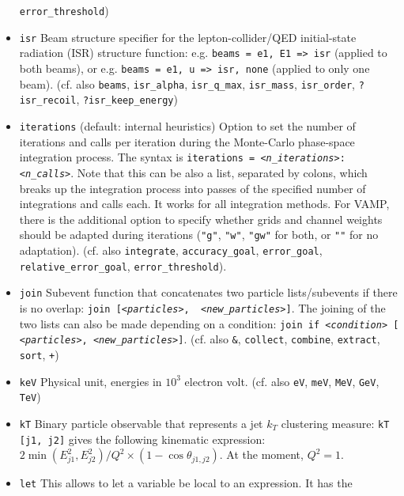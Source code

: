 \documentclass[12pt]{book}
\newcommand{\ttt}[1]{\texttt{#1}}
\begin{document}
\begin{itemize}
\ttt{error\_threshold})
\item
\ttt{isr} \newline
Beam structure specifier for the lepton-collider/QED initial-state
radiation (ISR) structure function: e.g. \ttt{beams = e1, E1 => isr}
(applied to both beams), or e.g. \ttt{beams = e1, u => isr, none}
(applied to only one beam). (cf. also \ttt{beams}, \ttt{isr\_alpha},
\ttt{isr\_q\_max}, \ttt{isr\_mass}, \ttt{isr\_order},
\ttt{?isr\_recoil}, \ttt{?isr\_keep\_energy})
\item
\ttt{iterations} \qquad (default: internal heuristics) \newline
Option to set the number of iterations and calls per iteration during
the Monte-Carlo phase-space integration process. The syntax is
\ttt{iterations = {\em <n\_iterations>}:{\em <n\_calls>}}. Note that this can be
also a list, separated by colons, which breaks up the integration
process into passes of the specified number of integrations and calls
each. It works for all integration methods. For VAMP, there is the
additional option to specify whether grids and channel weights should
be adapted during iterations (\ttt{"g"}, \ttt{"w"},
\ttt{"gw"} for both, or \ttt{""} for no adaptation).   (cf. also
\ttt{integrate}, \ttt{accuracy\_goal}, \ttt{error\_goal},
\ttt{relative\_error\_goal}, \ttt{error\_threshold}).
\item
\ttt{join} \newline
Subevent function that concatenates two particle lists/subevents if
there is no overlap: \ttt{join [{\em <particles>}, {\em
<new\_particles>}]}. The joining of the two lists can also be made
depending on a condition: \ttt{join if {\em <condition>} [{\em
<particles>}, {\em <new\_particles>}]}. (cf. also \ttt{\&},
\ttt{collect}, \ttt{combine}, \ttt{extract}, \ttt{sort}, \ttt{+})
\item
\ttt{keV} \newline
Physical unit, energies in $10^3$ electron volt. (cf. also \ttt{eV},
\ttt{meV}, \ttt{MeV}, \ttt{GeV}, \ttt{TeV})
\item
\ttt{kT} \newline
Binary particle observable that represents a jet $k_T$ clustering
measure: \ttt{kT [j1, j2]} gives the following kinematic expression:
$2 \min(E_{j1}^2, E_{j2}^2) / Q^2 \times (1 - \cos\theta_{j1,j2})$. At the
moment, $Q^2 = 1$.
\item
\ttt{let} \newline
This allows to let a variable be local to an expression. It has the

\end{itemize}
\end{document}
